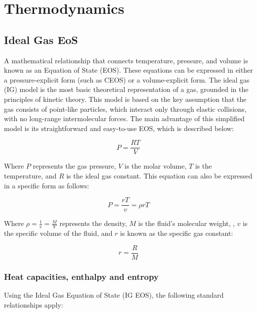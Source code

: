 \chapter{ Thermodynamics}
\chaptertoc{}

\section{Ideal Gas EoS}

A mathematical relationship that connects temperature, pressure, and volume is known as an Equation of State (EOS). These equations can be expressed in either a pressure-explicit form (such as CEOS) or a volume-explicit form. The ideal gas (IG) model is the most basic theoretical representation of a gas, grounded in the principles of kinetic theory. This model is based on the key assumption that the gas consists of point-like particles, which interact only through elastic collisions, with no long-range intermolecular forces. The main advantage of this simplified model is its straightforward and easy-to-use EOS, which is described below:

\begin{equation}
	P = \frac{RT}{V}
\end{equation}

Where $P$ represents the gas pressure, $V$ is the molar volume, $T$ is the temperature, and $R$ is the ideal gas constant. This equation can also be expressed in a specific form as follows:

\begin{equation}
	P = \frac{rT}{v} = \rho rT
\end{equation}

Where $\rho = \frac{1}{v}=\frac{M}{V}$ represents the density, $M$ is the fluid's molecular weight, , $v$ is the specific volume of the fluid, and $r$ is known as the specific gas constant:

\begin{equation}
	r = \frac{R}{M}
\end{equation}

	\subsection{Heat capacities, enthalpy and entropy}

	Using the Ideal Gas Equation of State (IG EOS), the following standard relationships apply:
	
